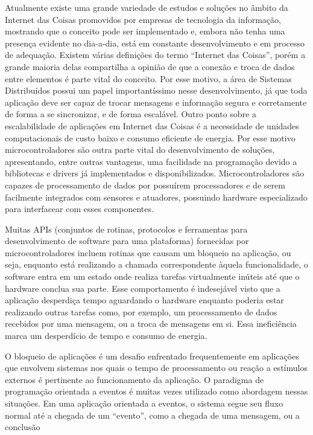 \documentclass{article}
\begin{document}
\tab Atualmente existe uma grande variedade de estudos e soluções no âmbito da Internet das Coisas
promovidos por empresas de tecnologia da informação, mostrando que o conceito pode ser
implementado e, embora não tenha uma presença evidente no dia-a-dia, está em constante
desenvolvimento e em processo de adequação. Existem várias definições do termo “Internet das
Coisas”, porém a grande maioria delas compartilha a opinião de que a conexão e troca de dados
entre elementos é parte vital do conceito. Por esse motivo, a área de Sistemas Distribuídos possui um
papel importantíssimo nesse desenvolvimento, já que toda aplicação deve ser capaz de trocar
mensagens e informação segura e corretamente de forma a se sincronizar, e de forma escalável. \cite{singh2014}
Outro ponto sobre a escalabilidade de aplicações em Internet das Coisas é a necessidade de unidades
computacionais de custo baixo e consumo eficiente de energia. Por esse motivo microcontroladores
são outra parte vital do desenvolvimento de soluções, apresentando, entre outras vantagens, uma
facilidade na programação devido a bibliotecas e drivers já implementados e disponibilizados.
Microcontroladores são capazes de processamento de dados por possuírem processadores e de
serem facilmente integrados com sensores e atuadores, possuindo hardware especializado para
interfacear com esses componentes.
\par Muitas APIs (conjuntos de rotinas, protocolos e ferramentas para desenvolvimento de software para
uma plataforma) fornecidas por microcontroladores incluem rotinas que causam um bloqueio na
aplicação, ou seja, enquanto está realizando a chamada correspondente àquela funcionalidade, o
software entra em um estado onde realiza tarefas virtualmente inúteis até que o hardware conclua sua
parte. Esse comportamento é indesejável visto que a aplicação desperdiça tempo aguardando o
hardware enquanto poderia estar realizando outras tarefas como, por exemplo, um processamento de
dados recebidos por uma mensagem, ou a troca de mensagens em si. Essa ineficiência marca um
desperdício de tempo e consumo de energia.
\par O bloqueio de aplicações é um desafio enfrentado frequentemente em aplicações que envolvem
sistemas nos quais o tempo de processamento ou reação a estímulos externos é pertinente ao
funcionamento da aplicação. O paradigma de programação orientada a eventos é muitas vezes
utilizado como abordagem nessas situações. Em uma aplicação orientada a eventos, o sistema segue
seu fluxo normal até a chegada de um “evento”, como a chegada de uma mensagem, ou a conclusão
\end{document}
